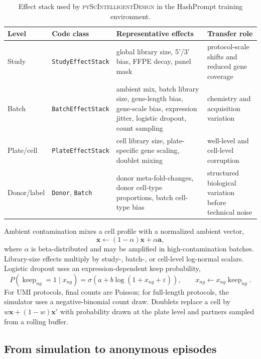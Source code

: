 \documentclass{article}
\newcommand{\eps}{\varepsilon}
\begin{document}
\begin{table}[t]
\centering
\small
\setlength{\tabcolsep}{4pt}
\caption{Effect stack used by \textsc{pyScIntelligentDesign} in the HashPrompt training environment.}
\label{tab:effect_stack}
\begin{tabularx}{\textwidth}{@{}lllX@{}}
\toprule
\textbf{Level} & \textbf{Code class} & \textbf{Representative effects} & \textbf{Transfer role} \\
\midrule
Study & \texttt{StudyEffectStack} & global library size, 5'/3' bias, FFPE decay, panel mask & protocol-scale shifts and reduced gene coverage \\
Batch & \texttt{BatchEffectStack} & ambient mix, batch library size, gene-length bias, gene-scale bias, expression jitter, logistic dropout, count sampling & chemistry and acquisition variation \\
Plate/cell & \texttt{PlateEffectStack} & cell library size, plate-specific gene scaling, doublet mixing & well-level and cell-level corruption \\
Donor/label & \texttt{Donor}, \texttt{Batch} & donor meta-fold-changes, donor cell-type proportions, batch cell-type bias & structured biological variation before technical noise \\
\bottomrule
\end{tabularx}
\end{table}

Ambient contamination mixes a cell profile with a normalized ambient vector,
\begin{equation}
    \mathbf{x}\leftarrow(1-\alpha)\mathbf{x}+\alpha\mathbf{a},
\end{equation}
where \(\alpha\) is beta-distributed and may be amplified in high-contamination batches. Library-size effects multiply by study-, batch-, or cell-level log-normal scalars. Logistic dropout uses an expression-dependent keep probability,
\begin{equation}
    P(\operatorname{keep}_{ng}=1\mid x_{ng})=\sigma(a+b\log(1+x_{ng}+\eps)),
    \qquad
    x_{ng}\leftarrow x_{ng}\operatorname{keep}_{ng}.
\end{equation}
For UMI protocols, final counts are Poisson; for full-length protocols, the simulator uses a negative-binomial count draw. Doublets replace a cell by \(w\mathbf{x}+(1-w)\mathbf{x}'\) with probability drawn at the plate level and partners sampled from a rolling buffer.

\subsection{From simulation to anonymous episodes}
\end{document}

